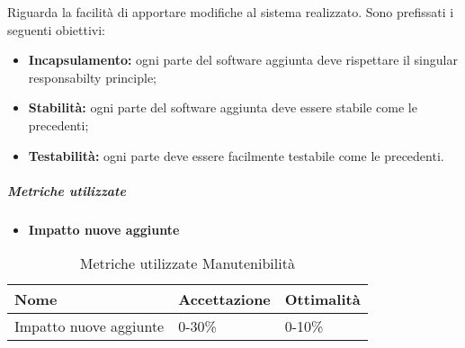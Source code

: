 Riguarda la facilità di apportare modifiche al sistema realizzato. Sono prefissati i seguenti obiettivi:
\begin{itemize}
	\item \textbf{Incapsulamento:} ogni parte del software aggiunta deve rispettare il singular responsabilty principle\pedice;
	\item \textbf{Stabilità:} ogni parte del software aggiunta deve essere stabile come le precedenti;
	\item \textbf{Testabilità:} ogni parte deve essere facilmente testabile come le precedenti.
\end{itemize}

\subparagraph{Metriche utilizzate}
\begin{itemize}
	\item \textbf{Impatto nuove aggiunte}
\end{itemize}
\begin{table}[H]
	\centering
	\renewcommand{\arraystretch}{2} 
		\begin{tabular}{|l|l|l|}
			\rowcolor{orange!50}
			\hline
			\textbf{Nome} & \textbf{Accettazione} & \textbf{Ottimalità} \\ \hline
			Impatto nuove aggiunte        &           0-30\%            &      0-10\%         \\ \hline                       
		\end{tabular}
	\caption{Metriche utilizzate Manutenibilità}
\end{table}
\clearpage
